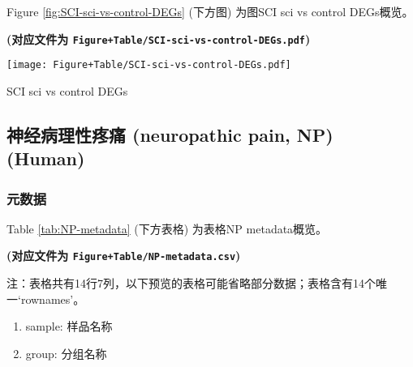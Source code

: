 \documentclass[
]{article}
\providecommand{\tightlist}{%
  \setlength{\itemsep}{0pt}\setlength{\parskip}{0pt}}
\begin{document}
Figure \ref{fig:SCI-sci-vs-control-DEGs} (下方图) 为图SCI sci vs control DEGs概览。

\textbf{(对应文件为 \texttt{Figure+Table/SCI-sci-vs-control-DEGs.pdf})}

\def\@captype{figure}
\begin{center}
\texttt{[image: Figure+Table/SCI-sci-vs-control-DEGs.pdf]}
\caption{SCI sci vs control DEGs}\label{fig:SCI-sci-vs-control-DEGs}
\end{center}

\hypertarget{ux795eux7ecfux75c5ux7406ux6027ux75bcux75db-neuropathic-pain-np-human}{%
\subsection{神经病理性疼痛 (neuropathic pain, NP) (Human)}\label{ux795eux7ecfux75c5ux7406ux6027ux75bcux75db-neuropathic-pain-np-human}}

\hypertarget{ux5143ux6570ux636e-1}{%
\subsubsection{元数据}\label{ux5143ux6570ux636e-1}}

Table \ref{tab:NP-metadata} (下方表格) 为表格NP metadata概览。

\textbf{(对应文件为 \texttt{Figure+Table/NP-metadata.csv})}

\begin{center}\begin{tcolorbox}[colback=gray!10, colframe=gray!50, width=0.9\linewidth, arc=1mm, boxrule=0.5pt]注：表格共有14行7列，以下预览的表格可能省略部分数据；表格含有14个唯一`rownames'。
\end{tcolorbox}
\end{center}
\begin{center}\begin{tcolorbox}[colback=gray!10, colframe=gray!50, width=0.9\linewidth, arc=1mm, boxrule=0.5pt]\begin{enumerate}\tightlist
\item sample: 样品名称
\item group: 分组名称
\end{enumerate}\end{tcolorbox}
\end{center}
\end{document}
